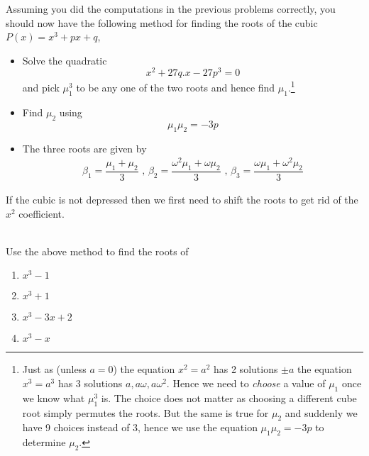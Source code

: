 Assuming you did the computations in the previous problems correctly, you should now have the following method for finding the roots of the cubic $P(x) = x^3 + px + q$,
  \begin{itemize}
    \item Solve the quadratic $$x^2 + 27q .x - 27 p^3 = 0$$ and pick $ \mu_1^3$ to be any one of the two roots and hence find $ \mu_1$.\footnote{Just as (unless $ a=0$) the equation $ x^2=a^2 $ has 2 solutions $ \pm a$ the equation $ x^3=a^3 $ has 3 solutions $ a, a \omega, a \omega^2$. 
    Hence we need to \emph{choose} a value of $ \mu_1$ once we know what $ \mu_1^3$ is. 
    The choice does not matter as choosing a different cube root simply permutes the roots. But the same is true for $ \mu_2$ and suddenly we have 9 choices instead of 3, hence we use the equation $ \mu_1 \mu_2 = -3p$ to determine $ \mu_2$.}
    \item Find $ \mu_2$ using $$ \mu_1 \mu_2 = -3p$$
    \item The three roots are given by
      \begin{align*}
        \beta_1 = \dfrac{\mu_1 + \mu_2}{3} 
        \mbox { , } \beta_2 = \dfrac{\omega^2 \mu_1 + \omega \mu_2}{3}
        \mbox { , } \beta_3 = \dfrac{\omega \mu_1 + \omega^2 \mu_2}{3}
      \end{align*}
  \end{itemize}
If the cubic is not depressed then we first need to shift the roots to get rid of the $ x^2$ coefficient.\\\\


\iffalse To fix this notice that by the first part of the previous problem $ \mu_1 \mu_2$ is completely determined by $ p$ and $ q$ hence once we find $ \mu_1$ we automatically get $ \mu_2$. We're now left with 3 choices for $ \mu_1$. It turns out that these three choices merely change the order of the roots $ \beta_1, \beta_2, \beta_3$ and hence any choice is equally good. 
\fi

\begin{questions}[resume]
  \item Use the above method to find the roots of 
    \begin{enumerate}
      \item $ x^3 - 1$
      \item $ x^3 + 1$
      \item $ x^3 - 3x + 2$
      \item $ x^3 - x$
    \end{enumerate} 
\end{questions}

